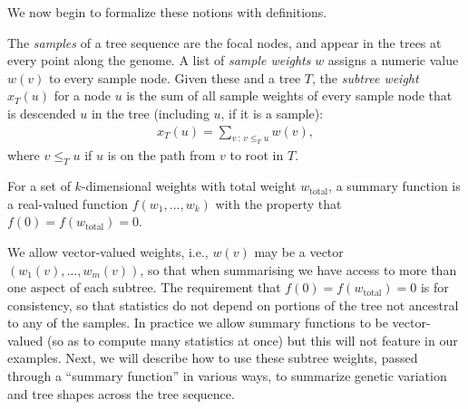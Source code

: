 \documentclass{article}
\newcommand{\iw}{w} %
\newcommand{\tiw}{w_\text{total}} %
\newcommand{\nw}{x} %
\begin{document}
We now begin to formalize these notions with definitions.


\begin{definition}
    The \emph{samples} of a tree sequence are the focal nodes, 
    and appear in the trees at every point along the genome.
    A list of \emph{sample weights} $\iw$ assigns a numeric value $\iw(v)$
    to every sample node.
    Given these and a tree $T$,
    the \emph{subtree weight} $\nw_T(u)$ for a node $u$ is the sum of all sample weights
    of every sample node that is descended $u$ in the tree (including $u$, if it is a sample):
    \begin{align*}
        \nw_T(u) = \sum_{v \,:\, v \le_T u} \iw(v) ,
    \end{align*}
    where $v \le_T u$ if $u$ is on the path from $v$ to root in $T$.
\end{definition}

\begin{definition}
    For a set of $k$-dimensional weights with total weight $\tiw$,
    a summary function is a real-valued function $f(w_1, \ldots, w_k)$
    with the property that $f(0) = f(\tiw) = 0$.
\end{definition}

We allow vector-valued weights,
i.e., $\iw(v)$ may be a vector $(\iw_1(v), \ldots, \iw_m(v))$,
so that when summarising we have access to more than one aspect of each subtree.
The requirement that $f(0) = f(\tiw) = 0$ is for consistency,
so that statistics do not depend on portions of the tree not ancestral to any of the samples.
In practice we allow summary functions to be vector-valued (so as to compute many statistics at once)
but this will not feature in our examples.
Next, we will describe how to use these subtree weights,
passed through a ``summary function'' in various ways,
to summarize genetic variation and tree shapes across the tree sequence.
\end{document}

